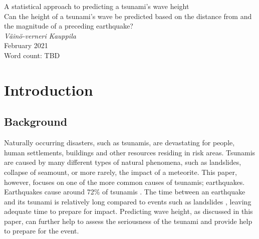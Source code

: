\documentclass[11pt,letterpaper]{article}
\begin{document}
\doublespacing %



\begin{titlepage}
    \begin{center}
        \vspace*{4cm}
        A statistical approach to predicting a tsunami’s wave height \\
        \vspace{1cm}
        Can the height of a tsunami's wave be predicted based on the distance from and
        the magnitude of a preceding earthquake? \\
        \vspace{1cm}
        \textit{Väinö-verneri Kauppila} \\
        February 2021 \\
        \vspace{4cm}
        Word count: TBD
        \vfill
        \vspace{0.1cm}
    \end{center}
\end{titlepage}



\begin{center}
    \tableofcontents
    \vspace{1in}

\end{center}



\newpage


\section{Introduction}

\subsection{Background}

Naturally occurring disasters, such as tsunamis, are devastating for people, human settlements, 
buildings and other resources residing in risk areas. Tsunamis are caused
by many different types of natural phenomena, such as landslides, collapse of
seamount, or more rarely, the impact of a meteorite. This paper, however, focuses
on one of the more common causes of tsunamis; earthquakes. Earthquakes cause around 72\% 
of tsunamis \cite{pacifictsunamimuseum}. The time between an earthquake and its tsunami is 
relatively long compared to events such as landslides \cite{sue_nokes_walters},
leaving adequate time to prepare for impact. Predicting wave height, as discussed in this 
paper, can further help to assess the seriousness of the tsunami and provide help to 
prepare for the event.
\end{document}
